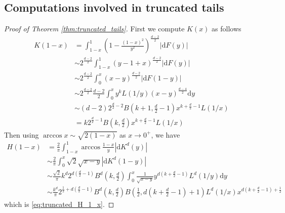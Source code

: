 \documentclass{aptpub}
\def\d{\mathrm{d}}
\begin{document}
\subsection{Computations involved in truncated tails}
\begin{proof}[Proof of Theorem \ref{thm:truncated_tails}]
First we compute $K(x)$ as follows
\begin{align*}
    K(1-x)  & = \int_{1-x}^1 \left(1-\frac{(1-x)^2}{y^2}\right)^{\frac{d-2}{2}} |\d F(y)| \\
    & \sim 2^{\frac{d-2}{2}} \int_{1-x}^1 (y-1+x)^{\frac{d-2}{2}} |\d F(y)| \\
    & \sim 2^{\frac{d-2}{2}} \int_0^x (x-y)^{\frac{d-2}{2}} |\d F(1-y)| \\
    & \sim 2^{\frac{d-2}{2}} \frac{d-2}{2} \int_0^x y^k L(1/y) (x-y)^{\frac{d-4}{2}} \d y\\
    & \sim (d-2)2^{\frac{d}{2}-2} B(k+1,\frac{d}{2}-1)x^{k+\frac{d}{2}-1}L(1/x)\\
    & = k 2^{\frac{d}{2}-1} B(k, \frac{d}{2}) x^{k+\frac{d}{2}-1} L(1/x) 
\end{align*}
Then using $\arccos x \sim \sqrt{2(1-x)}$ as $x\to 0^+$,
we have
\begin{align*}
     H(1-x) & = \frac{2}{\pi} \int_{1-x}^{1}
     \arccos\frac{1-x}{y}
     |\d K^d(y)| \\
     &\sim \frac{2}{\pi}\int_0^x \sqrt{2}\sqrt{x-y} |\d K^d(1-y)| \\
     &\sim \frac{\sqrt{2}}{\pi} k^d
     2^{d(\frac{d}{2}-1)} B^d(k, \frac{d}{2})
      \int_0^x \frac{1}{\sqrt{x-y}} y^{d(k+\frac{d}{2}-1)} L^d(1/y) \d y\\
     &\sim \frac{k^d}{\pi}
     2^{\frac{1}{2} + d(\frac{d}{2}-1)} B^d(k, \frac{d}{2})
     B\left( \frac{1}{2},
     d(k+\frac{d}{2} -1)+1 \right) L^d(1/x) x^{d(k+\frac{d}{2}-1)+\frac{1}{2}}
\end{align*}
which is \eqref{eq:truncated_H_1_x}.


\end{proof}
\end{document}
